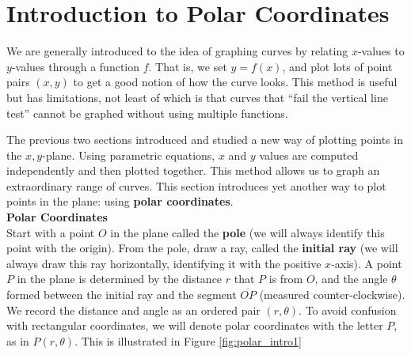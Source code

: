 \section{Introduction to Polar Coordinates}\label{sec:polar}

We are generally introduced to the idea of graphing curves by relating $x$-values to $y$-values through a function $f$. That is, we set $y=f(x)$, and plot lots of point pairs $(x,y)$ to get a good notion of how the curve looks. This method is useful but has limitations, not least of which is that curves that ``fail the vertical line test'' cannot be graphed without using multiple functions.

The previous two sections introduced and studied a new way of plotting points in the $x,y$-plane. Using parametric equations, $x$ and $y$ values are computed independently and then plotted together. This method allows us to graph an extraordinary range of curves. This section introduces yet another way to plot points in the plane: using \textbf{polar coordinates}. \\

\noindent\textbf{\large Polar Coordinates}\\

Start with a point $O$ in the plane called the \textbf{pole} (we will always identify this point with the origin). From the pole, draw a ray, called the \textbf{initial ray} (we will always draw this ray horizontally, identifying it with the positive $x$-axis). A point $P$ in the plane is determined by the distance $r$ that $P$ is from $O$, and the angle $\theta$ formed between the initial ray and the segment $\overline{OP}$ (measured counter-clockwise). We record the distance and angle as an ordered pair $(r,\theta)$. To avoid confusion with rectangular coordinates, we will denote polar coordinates with the letter $P$, as in $P(r,\theta)$. This is illustrated in Figure \ref{fig:polar_intro1}



